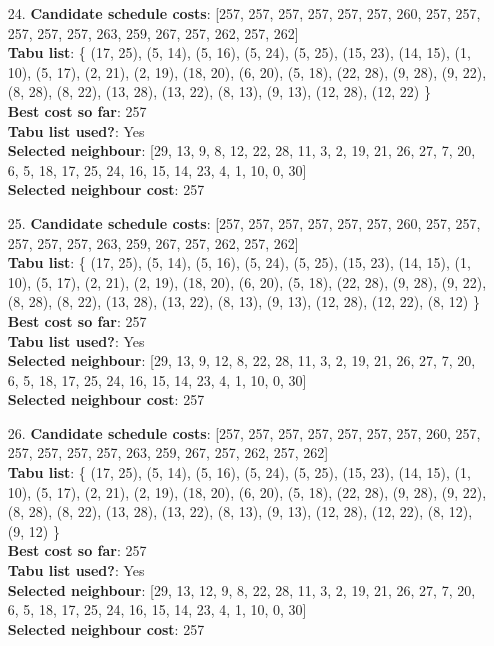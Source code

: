 \documentclass[fleqn]{article}
\begin{document}
\begin{itemize}
    \item[24.] \textbf{Candidate schedule costs}: [257, 257, 257, 257, 257, 257, 260, 257, 257, 257, 257, 257, 263, 259, 267, 257, 262, 257, 262] \\
    \textbf{Tabu list}: \{ (17, 25), (5, 14), (5, 16), (5, 24), (5, 25), (15, 23), (14, 15), (1, 10), (5, 17), (2, 21), (2, 19), (18, 20), (6, 20), (5, 18), (22, 28), (9, 28), (9, 22), (8, 28), (8, 22), (13, 28), (13, 22), (8, 13), (9, 13), (12, 28), (12, 22) \} \\
    \textbf{Best cost so far}: 257 \\
    \textbf{Tabu list used?}: Yes \\
    \textbf{Selected neighbour}: [29, 13, 9, 8, 12, 22, 28, 11, 3, 2, 19, 21, 26, 27, 7, 20, 6, 5, 18, 17, 25, 24, 16, 15, 14, 23, 4, 1, 10, 0, 30] \\
    \textbf{Selected neighbour cost}: 257
      

    \item[25.] \textbf{Candidate schedule costs}: [257, 257, 257, 257, 257, 257, 260, 257, 257, 257, 257, 257, 263, 259, 267, 257, 262, 257, 262] \\
    \textbf{Tabu list}: \{ (17, 25), (5, 14), (5, 16), (5, 24), (5, 25), (15, 23), (14, 15), (1, 10), (5, 17), (2, 21), (2, 19), (18, 20), (6, 20), (5, 18), (22, 28), (9, 28), (9, 22), (8, 28), (8, 22), (13, 28), (13, 22), (8, 13), (9, 13), (12, 28), (12, 22), (8, 12) \} \\
    \textbf{Best cost so far}: 257 \\
    \textbf{Tabu list used?}: Yes \\
    \textbf{Selected neighbour}: [29, 13, 9, 12, 8, 22, 28, 11, 3, 2, 19, 21, 26, 27, 7, 20, 6, 5, 18, 17, 25, 24, 16, 15, 14, 23, 4, 1, 10, 0, 30] \\
    \textbf{Selected neighbour cost}: 257
      

    \item[26.] \textbf{Candidate schedule costs}: [257, 257, 257, 257, 257, 257, 257, 260, 257, 257, 257, 257, 257, 263, 259, 267, 257, 262, 257, 262] \\
    \textbf{Tabu list}: \{ (17, 25), (5, 14), (5, 16), (5, 24), (5, 25), (15, 23), (14, 15), (1, 10), (5, 17), (2, 21), (2, 19), (18, 20), (6, 20), (5, 18), (22, 28), (9, 28), (9, 22), (8, 28), (8, 22), (13, 28), (13, 22), (8, 13), (9, 13), (12, 28), (12, 22), (8, 12), (9, 12) \} \\
    \textbf{Best cost so far}: 257 \\
    \textbf{Tabu list used?}: Yes \\
    \textbf{Selected neighbour}: [29, 13, 12, 9, 8, 22, 28, 11, 3, 2, 19, 21, 26, 27, 7, 20, 6, 5, 18, 17, 25, 24, 16, 15, 14, 23, 4, 1, 10, 0, 30] \\
    \textbf{Selected neighbour cost}: 257
      


\end{itemize}
\end{document}
